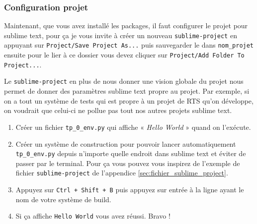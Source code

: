 \documentclass[a4paper,12pt]{article}
\begin{document}
\subsubsection{Configuration projet}

Maintenant, que vous avez installé les packages, il faut configurer le projet pour sublime text, pour ça je vous invite à créer un nouveau \texttt{sublime-project} en appuyant sur \texttt{Project/Save Project As...} puis sauvegarder le dans \texttt{nom\_projet} ensuite pour le lier à ce dossier vous devez cliquer sur \texttt{Project/Add Folder To Project...}.

Le \texttt{sublime-project} en plus de nous donner une vision globale du projet nous permet de donner des paramètres sublime text propre au projet. Par exemple, si on a tout un système de tests qui est propre à un projet de RTS qu'on développe, on voudrait que celui-ci ne pollue pas tout nos autres projets sublime text.    



\begin{enumerate}
     \item Créer un fichier \texttt{tp\_0\_env.py} qui affiche « \textit{Hello World} » quand on l’exécute.
     \item Créer un système de construction pour pouvoir lancer automatiquement \texttt{tp\_0\_env.py} depuis n'importe quelle endroit dans sublime text et éviter de passer par le terminal. Pour ça vous pouvez vous inspirez de l'exemple de fichier \texttt{sublime-project} de l'appendice \ref{sec:fichier_sublime_project}.
     \item Appuyez sur \texttt{Ctrl + Shift + B} puis appuyez sur entrée à la ligne ayant le nom de votre système de build.
     \item Si ça affiche \texttt{Hello World} vous avez réussi. Bravo !
 \end{enumerate} 


\newpage
\appendix
\end{document}
